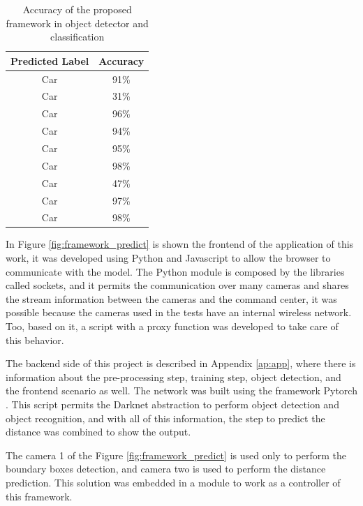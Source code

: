 \begin{table}[H]
\centering
\caption{Accuracy of the proposed framework in object detector and classification}
\begin{tabular}{c|c}
\hline
Predicted Label & Accuracy \\ \hline
Car             & 91\%     \\ \hline
Car             & 31\%     \\ \hline
Car             & 96\%     \\ \hline
Car             & 94\%     \\ \hline
Car             & 95\%     \\ \hline
Car             & 98\%     \\ \hline
Car             & 47\%     \\ \hline
Car             & 97\%     \\ \hline
Car             & 98\%     \\ \hline
\end{tabular}
\label{tab:accuracy}
\end{table}



In Figure \ref{fig:framework_predict} is shown the frontend of the application of this work, it was developed using Python and Javascript to allow the browser to communicate with the model. The Python module is composed by the libraries called sockets, and it permits the communication over many cameras and shares the stream information between the cameras and the command center, it was possible because the cameras used in the tests have an internal wireless network. Too, based on it, a script with a proxy function was developed to take care of this behavior. 

The backend side of this project is described in Appendix \ref{ap:app}, where there is information about the pre-processing step, training step, object detection, and the frontend scenario as well. The network was built using the framework Pytorch \cite{paszke2019pytorch}. This script permits the Darknet abstraction to perform object detection and object recognition, and with all of this information, the step to predict the distance was combined to show the output. 

The camera 1 of the Figure \ref{fig:framework_predict} is used only to perform the boundary boxes detection, and camera two is used to perform the distance prediction. This solution was embedded in a module to work as a controller of this framework.

